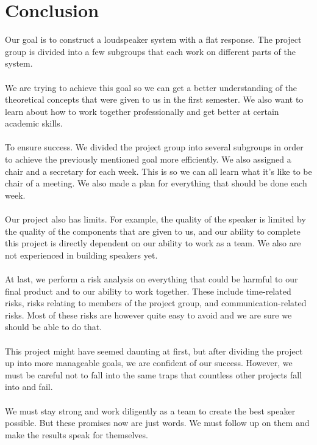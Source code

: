 \chapter{Conclusion} 
Our goal is to construct a loudspeaker system with a flat response. The project group is divided into a few subgroups that each work on different parts of the system. \\
\\
We are trying to achieve this goal so we can get a better understanding of the theoretical concepts that were given to us in the first semester. We also want to learn about how to work together professionally and get better at certain academic skills. \\
\\
To ensure success. We divided the project group into several subgroups in order to achieve the previously mentioned goal more efficiently. We also assigned a chair and a secretary for each week. This is so we can all learn what it's like to be chair of a meeting. We also made a plan for everything that should be done each week. \\
\\
Our project also has limits. For example, the quality of the speaker is limited by the quality of the components that are given to us, and our ability to complete this project is directly dependent on our ability to work as a team. We also are not experienced in building speakers yet. \\
\\
At last, we perform a risk analysis on everything that could be harmful to our final product and to our ability to work together. These include time-related risks, risks relating to members of the project group, and communication-related risks. Most of these risks are however quite easy to avoid and we are sure we should be able to do that. \\
\\
This project might have seemed daunting at first, but after dividing the project up into more manageable goals, we are confident of our success. However, we must be careful not to fall into the same traps that countless other projects fall into and fail. \\
\\
We must stay strong and work diligently as a team to create the best speaker possible. But these promises now are just words. We must follow up on them  and make the results speak for themselves.\\